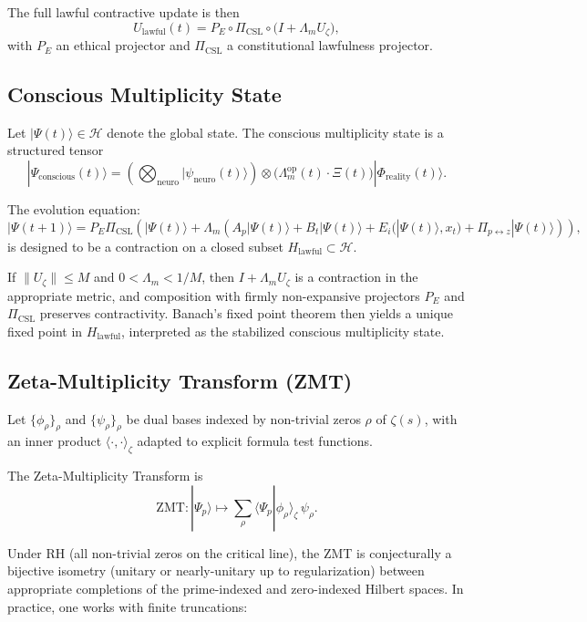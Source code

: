 \documentclass[11pt]{article}
\begin{document}
The full lawful contractive update is then
\[
U_{\text{lawful}}(t)
  = P_E
    \circ
    \Pi_{\mathrm{CSL}}
    \circ 
    \bigl(I + \Lambda_m U_\zeta\bigr),
\]
with $P_E$ an ethical projector and $\Pi_{\mathrm{CSL}}$ a constitutional lawfulness projector.

\subsection{Conscious Multiplicity State}

Let $|\Psi(t)\rangle \in \mathcal{H}$ denote the global state. The conscious multiplicity state is a structured tensor
\[
|\Psi_{\text{conscious}}(t)\rangle
  =
  \left(\bigotimes_{\text{neuro}} |\psi_{\text{neuro}}(t)\rangle\right)
  \otimes
  \bigl(\Lambda_m^{\mathrm{op}}(t)\cdot \Xi(t)\bigr)
  |\Phi_{\text{reality}}(t)\rangle.
\]

The evolution equation:
\[
|\Psi(t+1)\rangle
 =
 P_E\Pi_{\mathrm{CSL}}\!\left(
    |\Psi(t)\rangle
    + \Lambda_m\left(
        A_p|\Psi(t)\rangle
        + B_t|\Psi(t)\rangle
        + E_i(|\Psi(t)\rangle,x_t)
        + \Pi_{p\leftrightarrow z}|\Psi(t)\rangle
    \right)
  \right),
\]
is designed to be a contraction on a closed subset $H_{\text{lawful}} \subset \mathcal{H}$.

If $\|U_\zeta\|\le M$ and $0<\Lambda_m < 1/M$, then $I+\Lambda_m U_\zeta$ is a contraction in the appropriate metric, and composition with firmly non-expansive projectors $P_E$ and $\Pi_{\mathrm{CSL}}$ preserves contractivity. Banach's fixed point theorem then yields a unique fixed point in $H_{\text{lawful}}$, interpreted as the stabilized conscious multiplicity state.

\subsection{Zeta-Multiplicity Transform (ZMT)}

Let $\{\phi_\rho\}_\rho$ and $\{\psi_\rho\}_\rho$ be dual bases indexed by non-trivial zeros $\rho$ of $\zeta(s)$, with an inner product $\langle \cdot,\cdot\rangle_\zeta$ adapted to explicit formula test functions.

The Zeta-Multiplicity Transform is
\[
\mathrm{ZMT}: |\Psi_p\rangle
  \mapsto \sum_{\rho}
      \langle \Psi_p|\phi_\rho\rangle_\zeta \,\psi_\rho.
\]

Under RH (all non-trivial zeros on the critical line), the ZMT is conjecturally a bijective isometry (unitary or nearly-unitary up to regularization) between appropriate completions of the prime-indexed and zero-indexed Hilbert spaces. In practice, one works with finite truncations:
\end{document}
